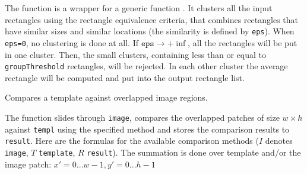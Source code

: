 The function is a wrapper for a generic function . It clusters all the input rectangles using the rectangle equivalence criteria, that combines rectangles that have similar sizes and similar locations (the similarity is defined by \texttt{eps}). When \texttt{eps=0}, no clustering is done at all. If $\texttt{eps}\rightarrow +\inf$, all the rectangles will be put in one cluster. Then, the small clusters, containing less than or equal to \texttt{groupThreshold} rectangles, will be rejected. In each other cluster the average rectangle will be computed and put into the output rectangle list.  

Compares a template against overlapped image regions.

\begin{description}
\end{description}

The function slides through \texttt{image}, compares the
overlapped patches of size $w \times h$ against \texttt{templ}
using the specified method and stores the comparison results to
\texttt{result}. Here are the formulas for the available comparison
methods ($I$ denotes \texttt{image}, $T$ \texttt{template},
$R$ \texttt{result}). The summation is done over template and/or the
image patch: $x' = 0...w-1, y' = 0...h-1$


